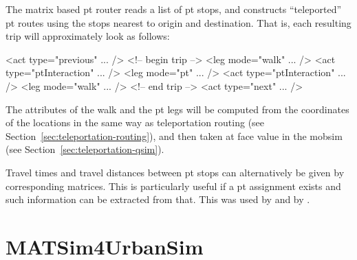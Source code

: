 The matrix based \gls{pt} router reads a list of \gls{pt} stops, and constructs ``teleported'' \gls{pt} routes using the stops nearest to origin and destination.  That is, each resulting trip will approximately look as follows:
\begin{xml}
<act type="previous" ... />
<!-- begin trip -->
<leg mode="walk" ... />
<act type="ptInteraction" ... />
<leg mode="pt" ... />
<act type="ptInteraction" ... />
<leg mode="walk" ... />
<!-- end trip -->
<act type="next" ... />  
\end{xml}

The attributes of the walk and the \gls{pt} legs will be computed from the coordinates of the locations in the same way as teleportation routing (see Section~\ref{sec:teleportation-routing}), and then taken at face value in the \gls{mobsim} (see Section~\ref{sec:teleportation-qsim}).

Travel times and travel distances between \gls{pt} stops can alternatively be given by corresponding matrices.  This is particularly useful if a \gls{pt} assignment exists and such information can be extracted from that.  This was used by \citet{RoederNagel2013SketchPlanningBrussels} and by \citet{ZoelligRenner_PhDThesis_2014}.

\section{MATSim4UrbanSim}
\label{sec:matsim4urbansim}





